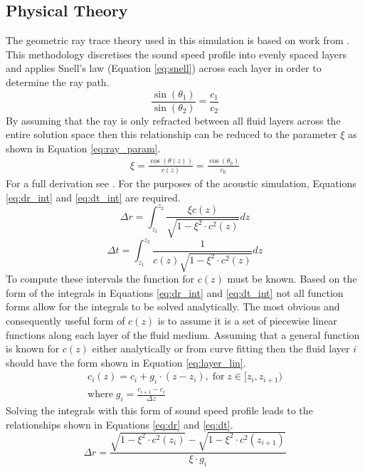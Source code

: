 \documentclass{article}
\begin{document}
\subsection{Physical Theory}
The geometric ray trace theory used in this simulation is based on work from \textcite{Hovem13}. This methodology discretises the sound speed profile into evenly spaced layers and applies Snell's law (Equation \ref{eq:snell}) across each layer in order to determine the ray path. 
\begin{equation}
  \label{eq:snell}
  \frac{\sin{(\theta_1)}}{\sin{(\theta_2)}}=\frac{c_1}{c_2}
\end{equation}
By assuming that the ray is only refracted between all fluid layers across the entire solution space then this relationship can be reduced to the parameter $\xi$ as shown in Equation \ref{eq:ray_param}.
\begin{align}
  \label{eq:ray_param}
  \xi = \frac{\cos{(\theta(z))}}{c(z)} = \frac{\cos{(\theta_0)}}{c_0}
\end{align}
For a full derivation see \textcite{Hovem13}. For the purposes of the acoustic simulation, Equations \ref{eq:dr_int} and \ref{eq:dt_int} are required.
\begin{equation}
  \label{eq:dr_int}
  \Delta r = \int^{z_2}_{z_1}\frac{\xi c(z)}{\sqrt{1-\xi^2\cdot c^2(z)}}dz
\end{equation}
\begin{equation}
  \label{eq:dt_int}
  \Delta t = \int^{z_2}_{z_1}\frac{1}{c(z)\sqrt{1-\xi^2\cdot c^2(z)}}dz
\end{equation}
To compute these intervals the function for $c(z)$ must be known. Based on the form of the integrals in Equations \ref{eq:dr_int} and \ref{eq:dt_int} not all function forms allow for the integrals to be solved analytically. The most obvious and consequently useful form of $c(z)$ is to assume it is a set of piecewise linear functions along each layer of the fluid medium. Assuming that a general function is known for $c(z)$ either analytically or from curve fitting then the fluid layer $i$ should have the form shown in Equation \ref{eq:layer_lin}.
\begin{equation}
  \label{eq:layer_lin}
  \begin{split}
    c_i(z) = c_i+g_i\cdot(z-z_i),\;\mathrm{for}\;z\in[z_i, z_{i+1}) \\
    \mathrm{where}\;g_i=\frac{c_{i+1}-c_{i}}{\Delta z}
  \end{split}  
\end{equation}
Solving the integrals with this form of sound speed profile leads to the relationships shown in Equations \ref{eq:dr} and \ref{eq:dt}.
\begin{equation}
  \label{eq:dr}
  \Delta r = \frac{\sqrt{1-\xi^2\cdot c^2(z_i)} - \sqrt{1-\xi^2\cdot c^2(z_{i+1})}}{\xi\cdot g_i}
\end{equation}
\end{document}
